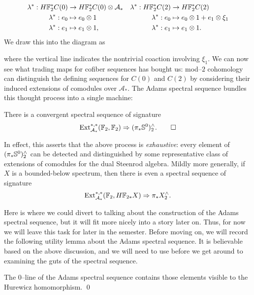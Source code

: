 \begin{align*}
\lambda^*: H\F_2^* C(0) & \to H\F_2^* C(0) \otimes \mathcal A_* & \lambda^*: H\F_2^* C(2) & \to H\F_2^* C(2) \\
\lambda^*: e_0 & \mapsto e_0 \otimes 1 & \lambda^*: e_0 & \mapsto e_0 \otimes 1 + e_1 \otimes \xi_1 \\
\lambda^*: e_1 & \mapsto e_1 \otimes 1, & \lambda^*: e_1 & \mapsto e_1 \otimes 1.
\end{align*}
We draw this into the diagram as
\begin{center}
\end{center}
where the vertical line indicates the nontrivial coaction involving $\xi_1$.  We can now see what trading maps for cofiber sequences has bought us: mod--$2$ cohomology can distinguish the defining sequences for $C(0)$ and $C(2)$ by considering their induced extensions of comodules over $\mathcal A_*$.  The Adams spectral sequence bundles this thought process into a single machine:
\begin{theorem}
There is a convergent spectral sequence of signature \[\Ext_{\mathcal A_*}^{*, *}(\F_2, \F_2) \Rightarrow (\pi_* \S^0)^\wedge_2. \qed\]
\end{theorem}
In effect, this asserts that the above process is \emph{exhaustive}: every element of $(\pi_* \S^0)^\wedge_2$ can be detected and distinguished by some representative class of extensions of comodules for the dual Steenrod algebra.  Mildly more generally, if $X$ is a bounded-below spectrum, then there is even a spectral sequence of signature \[\Ext_{\mathcal A_*}^{*, *}(\F_2, H\F_{2*} X) \Rightarrow \pi_* X^\wedge_2.\]

Here is where we could divert to talking about the construction of the Adams spectral sequence, but it will fit more nicely into a story later on.  Thus, for now we will leave this task for later in the semester.  Before moving on, we will record the following utility lemma about the Adams spectral sequence.  It is believable based on the above discussion, and we will need to use before we get around to examining the guts of the spectral sequence.
\begin{lemma}
The $0$--line of the Adams spectral sequence contains those elements visible to the Hurewicz homomorphism. \qed {}
\end{lemma}

